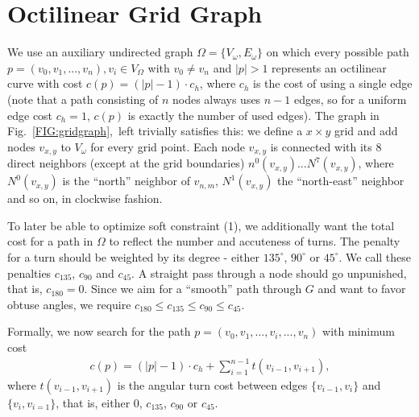 \documentclass{sig-alternate-sigmod09}
\begin{document}
\section{Octilinear Grid Graph}

We use an auxiliary undirected graph $\Omega = \{V_\omega, E_\omega\}$ on which every possible path $p = (v_0, v_1, ..., v_n), v_i \in V_\Omega$ with $v_0 \neq v_n$ and $|p| > 1$ represents an octilinear curve with cost $c(p) = (|p| - 1) \cdot c_h$, where $c_h$ is the cost of using a single edge (note that a path consisting of $n$ nodes always uses $n - 1$ edges, so for a uniform edge cost $c_h = 1$, $c(p)$ is exactly the number of used edges).
The graph in Fig.~\ref{FIG:gridgraph},~left trivially satisfies this: we define a $x\times y$ grid and add nodes $v_{x,y}$ to $V_\omega$ for every grid point.
Each node $v_{x,y}$ is connected with its 8 direct neighbors (except at the grid boundaries) $n^0(v_{x,y}) ... N^7(v_{x, y})$, where $N^0(v_{x, y})$ is the ``north'' neighbor of $v_{n, m}$,  $N^1(v_{x, y})$ the ``north-east'' neighbor and so on, in clockwise fashion.

To later be able to optimize soft constraint (1), we additionally want the total cost for a path in $\Omega$ to reflect the number and accuteness of turns.
The penalty for a turn should be weighted by its degree - either $135^{\circ}$, $90^{\circ}$ or $45^{\circ}$.
We call these penalties $c_{135}$, $c_{90}$ and $c_{45}$.
A straight pass through a node should go unpunished, that is, $c_{180} = 0$.
Since we aim for a ``smooth'' path through $G$ and want to favor obtuse angles, we require $c_{180} \leq c_{135} \leq c_{90} \leq c_{45}$.

Formally, we now search for the path $p = (v_0, v_1, ..., v_i, ..., v_n)$ with minimum cost
\begin{align}
	c(p) = (|p| - 1) \cdot c_h + \sum_{i=1}^{n - 1} t(v_{i-1}, v_{i+1}),
\end{align}
where $t(v_{i-1}, v_{i+1})$ is the angular turn cost between edges $\{v_{i-1}, v_{i}\}$ and $\{v_{i}, v_{i=1}\}$, that is, either 0, $c_{135}$, $c_{90}$ or $c_{45}$.
\end{document}
